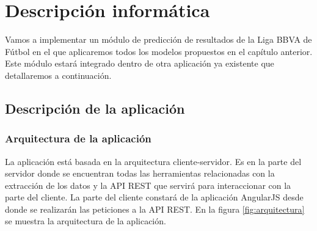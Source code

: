 \chapter{Descripción informática}

Vamos a implementar un módulo de predicción de resultados de la Liga BBVA de Fútbol en el que aplicaremos todos los modelos propuestos en el capítulo anterior. Este módulo estará integrado dentro de otra aplicación ya existente que detallaremos a continuación.

\section{Descripción de la aplicación}
\subsection{Arquitectura de la aplicación}
La aplicación está basada en la arquitectura cliente-servidor. Es en la parte del servidor donde se encuentran todas las herramientas relacionadas con la extracción de los datos y la API REST que servirá para interaccionar con la parte del cliente. La parte del cliente constará de la aplicación AngularJS desde donde se realizarán las peticiones a la API REST. En la figura \ref{fig:arquitectura} se muestra la arquitectura de la aplicación.

